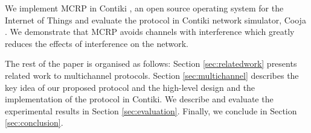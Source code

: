 


We implement MCRP in Contiki \cite{contiki}, an open source operating system for the Internet of Things and evaluate the protocol in Contiki network simulator, Cooja \cite{cooja}. 
We demonstrate that MCRP avoids channels with interference which greatly reduces the effects of interference on the network.

The rest of the paper is organised as follows: Section \ref{sec:relatedwork} presents related work to multichannel protocols. Section \ref{sec:multichannel} describes the key idea of our proposed protocol and the high-level design and the implementation of the protocol in Contiki. We describe and evaluate the experimental results in Section \ref{sec:evaluation}. Finally, we conclude in Section \ref{sec:conclusion}.